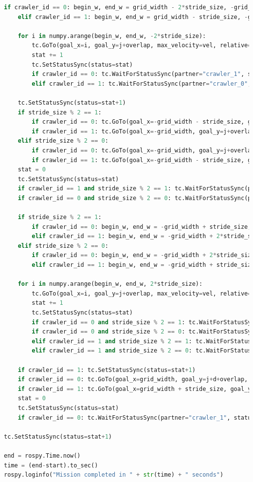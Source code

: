 \documentclass[francais,RandD]{rapportPFE}
\begin{document}
\begin{lstlisting}[language=Python,caption={Implémentation de l'algorithme de ski nordique},label=lst:ski_nordique]
	if crawler_id == 0: begin_w, end_w = grid_width - 2*stride_size, -grid_width - 1 - stride_size
	elif crawler_id == 1: begin_w, end_w = grid_width - stride_size, -grid_width - 1 - stride_size

	for i in numpy.arange(begin_w, end_w, -2*stride_size):
		tc.GoTo(goal_x=i, goal_y=j+overlap, max_velocity=vel, relative=False)
		stat += 1
		tc.SetStatusSync(status=stat)
		if crawler_id == 0: tc.WaitForStatusSync(partner="crawler_1", status=stat+1)
		elif crawler_id == 1: tc.WaitForStatusSync(partner="crawler_0", status=stat)

	tc.SetStatusSync(status=stat+1)
	if stride_size % 2 == 1:
		if crawler_id == 0: tc.GoTo(goal_x=-grid_width - stride_size, goal_y=j+overlap, max_velocity=vel, relative=False)
		if crawler_id == 1: tc.GoTo(goal_x=-grid_width, goal_y=j+overlap, max_velocity=vel, relative=False)
	elif stride_size % 2 == 0:
		if crawler_id == 0: tc.GoTo(goal_x=-grid_width, goal_y=j+overlap, max_velocity=vel, relative=False)
		if crawler_id == 1: tc.GoTo(goal_x=-grid_width - stride_size, goal_y=j+overlap, max_velocity=vel, relative=False)
	stat = 0
	tc.SetStatusSync(status=stat)
	if crawler_id == 1 and stride_size % 2 == 1: tc.WaitForStatusSync(partner="crawler_0", status=stat+1)
	if crawler_id == 0 and stride_size % 2 == 0: tc.WaitForStatusSync(partner="crawler_1", status=stat+1)

	if stride_size % 2 == 1:
		if crawler_id == 0: begin_w, end_w = -grid_width + stride_size, grid_width + 1 + stride_size
		elif crawler_id == 1: begin_w, end_w = -grid_width + 2*stride_size, grid_width + 1 + stride_size
	elif stride_size % 2 == 0:
		if crawler_id == 0: begin_w, end_w = -grid_width + 2*stride_size, grid_width + 1 + stride_size
		elif crawler_id == 1: begin_w, end_w = -grid_width + stride_size, grid_width + 1 + stride_size

	for i in numpy.arange(begin_w, end_w, 2*stride_size):
		tc.GoTo(goal_x=i, goal_y=j+overlap, max_velocity=vel, relative=False)
		stat += 1
		tc.SetStatusSync(status=stat)
		if crawler_id == 0 and stride_size % 2 == 1: tc.WaitForStatusSync(partner="crawler_1", status=stat)
		if crawler_id == 0 and stride_size % 2 == 0: tc.WaitForStatusSync(partner="crawler_1", status=stat+1)
		elif crawler_id == 1 and stride_size % 2 == 1: tc.WaitForStatusSync(partner="crawler_0", status=stat+1)
		elif crawler_id == 1 and stride_size % 2 == 0: tc.WaitForStatusSync(partner="crawler_0", status=stat)

	if crawler_id == 1: tc.SetStatusSync(status=stat+1)
	if crawler_id == 0: tc.GoTo(goal_x=grid_width, goal_y=j+d+overlap, max_velocity=vel, relative=False)
	if crawler_id == 1: tc.GoTo(goal_x=grid_width + stride_size, goal_y=j+d+overlap, max_velocity=vel, relative=False)
	stat = 0
	tc.SetStatusSync(status=stat)
	if crawler_id == 0: tc.WaitForStatusSync(partner="crawler_1", status=stat+1)

tc.SetStatusSync(status=stat+1)

end = rospy.Time.now()
time = (end-start).to_sec()
rospy.loginfo("Mission completed in " + str(time) + " seconds")

			\end{lstlisting}
\end{document}
